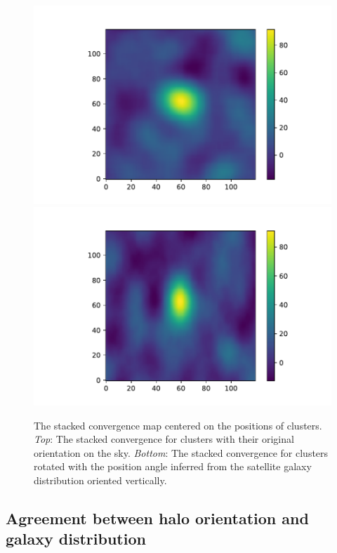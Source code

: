 \documentclass[fleqn,usenatbib]{mnras}
\begin{document}
\begin{figure}
\begin{center}
\includegraphics[width=\columnwidth]{massmap_2mom_norot.pdf}
\includegraphics[width=\columnwidth]{massmap_2mom.pdf}
\end{center}
\caption[]{The stacked convergence map centered on the positions of clusters. \emph{Top}: The stacked convergence for clusters with their original orientation on the sky. \emph{Bottom}: The stacked convergence for clusters rotated with the position angle inferred from the satellite galaxy distribution oriented vertically. 
\label{fig:mass}}
\end{figure}

\subsection{Agreement between halo orientation and galaxy distribution}
\end{document}
